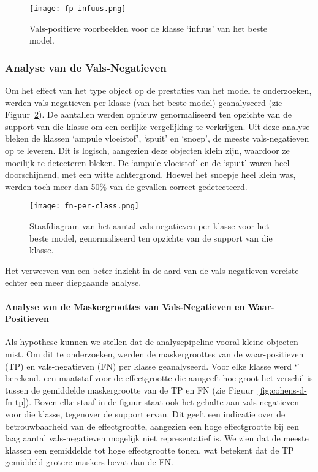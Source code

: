 \begin{figure}[H]
  \centering
  \texttt{[image: fp-infuus.png]}
  \caption[
    Voorbeelden van vals-positieven voor de klasse `infuus' van het beste model
  ]{\label{fig:fp-infuus}
    Vals-positieve voorbeelden voor de klasse `infuus' van het beste model.
    }
\end{figure}

\subsubsection{Analyse van de Vals-Negatieven}

Om het effect van het type object op de prestaties van het model te onderzoeken,
werden vals-negatieven per klasse (van het beste model) geanalyseerd (zie Figuur~\ref{fig:fn-per-class}).
De aantallen werden opnieuw genormaliseerd ten opzichte van de support van die klasse om een eerlijke vergelijking te verkrijgen.
Uit deze analyse bleken de klassen `ampule vloeistof', `spuit' en `snoep', de meeste vals-negatieven op te leveren.
Dit is logisch, aangezien deze objecten klein zijn, waardoor ze moeilijk te detecteren bleken.
De `ampule vloeistof' en de `spuit' waren heel doorschijnend, met een witte achtergrond.
Hoewel het snoepje heel klein was, werden toch meer dan 50\% van de gevallen correct gedetecteerd. 

\begin{figure}[H]
  \centering
  \texttt{[image: fn-per-class.png]}
  \caption[
    Staafdiagram van het aantal vals-negatieven per klasse voor het beste model.
  ]{\label{fig:fn-per-class}
    Staafdiagram van het aantal vals-negatieven per klasse voor het beste model, genormaliseerd ten opzichte van de support van die klasse.
  }
\end{figure}

Het verwerven van een beter inzicht in de aard van de vals-negatieven vereiste echter een meer diepgaande analyse.

\paragraph{Analyse van de Maskergroottes van Vals-Negatieven en Waar-Positieven}
Als hypothese kunnen we stellen dat de analysepipeline vooral kleine objecten mist. 
Om dit te onderzoeken, werden de maskergroottes van de waar-positieven (TP) en vals-negatieven (FN) per klasse geanalyseerd.
Voor elke klasse werd `' berekend, een maatstaf voor de effectgrootte die aangeeft hoe groot het verschil is tussen de gemiddelde maskergrootte van de TP en FN (zie Figuur~\ref{fig:cohens-d-fn-tp}).
Boven elke staaf in de figuur staat ook het gehalte aan vals-negatieven voor die klasse, tegenover de support ervan.
Dit geeft een indicatie over de betrouwbaarheid van de effectgrootte, aangezien een hoge effectgrootte bij een laag aantal vals-negatieven mogelijk niet representatief is.
We zien dat de meeste klassen een gemiddelde tot hoge effectgrootte tonen, wat betekent dat de TP gemiddeld grotere maskers bevat dan de FN.

